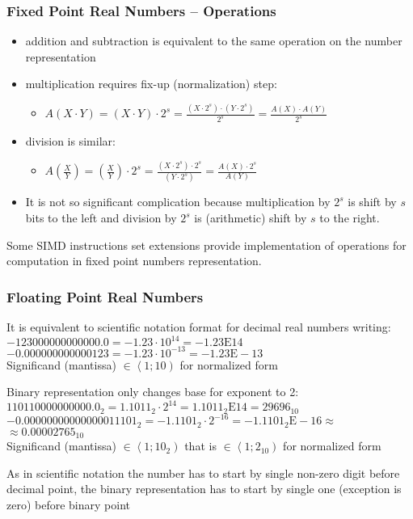 \documentclass{beamer}
\begin{document}
\begin{frame}
\frametitle{Fixed Point Real Numbers -- Operations}

\begin{itemize}
\item addition and subtraction is equivalent to the same operation on the number representation
\item multiplication requires fix-up (normalization) step:
\begin{itemize}
\item $A(X \cdot Y) = (X \cdot Y ) \cdot 2^s = \frac{(X \cdot 2^s)\cdot( Y\cdot 2^s) }{2^s} = \frac{A(X) \cdot A(Y)}{2^s}$
\end{itemize}
\item division is similar:
\begin{itemize}
\item $A(\frac{X}{Y}) = (\frac{X}{Y}) \cdot 2^s = \frac{(X \cdot 2^s)\cdot2^s }{( Y\cdot 2^s)} = \frac{A(X) \cdot 2^s}{A(Y)}$
\end{itemize}
\item It is not so significant complication because multiplication by $2^s$ is shift by $s$ bits to the left and division by $2^s$ is (arithmetic) shift by $s$ to the right.
\end{itemize}

\bigskip

Some SIMD instructions set extensions provide implementation of operations for computation in fixed point numbers representation.

\end{frame}


\begin{frame}
\frametitle{Floating Point Real Numbers }

\bigskip

It is equivalent to scientific notation format for decimal real numbers writing:
$-123 000 000 000 000.0 = -1.23 \cdot 10^{14} = -1.23\text{E} 14$\\
$-0.000 000 000 000 123 = -1.23 \cdot 10^{-13} = -1.23\text{E}-13$\\
Significand (mantissa) $\in \left\langle 1; 10 \right)$ for normalized form
\bigskip

Binary representation only changes base for exponent to 2:\\
$110 1100 0000 0000.0_2 = 1.1011_2 \cdot 2^{14} = 1.1011_2\text{E} 14 = 29696_{10}$\\
$-0.0000 0000 0000 0001 1101_2 = -1.1101_2 \cdot 2^{-16} = -1.1101_2\text{E}-16 \approx$\\
\phantom{xxxxxxxxxxxxxxxxxxxxxxxxxxxxxxxxxxxxxxxxxxxx}$\approx0.00002765_{10}$\\
Significand (mantissa) $\in \left\langle 1; 10_2 \right)$ that is
$\in \left\langle 1; 2_{10} \right)$ for normalized form
\bigskip

As in scientific notation the number has to start by single non-zero digit before decimal point, the binary representation has to start by single one (exception is zero) before binary point


\end{frame}
\end{document}
